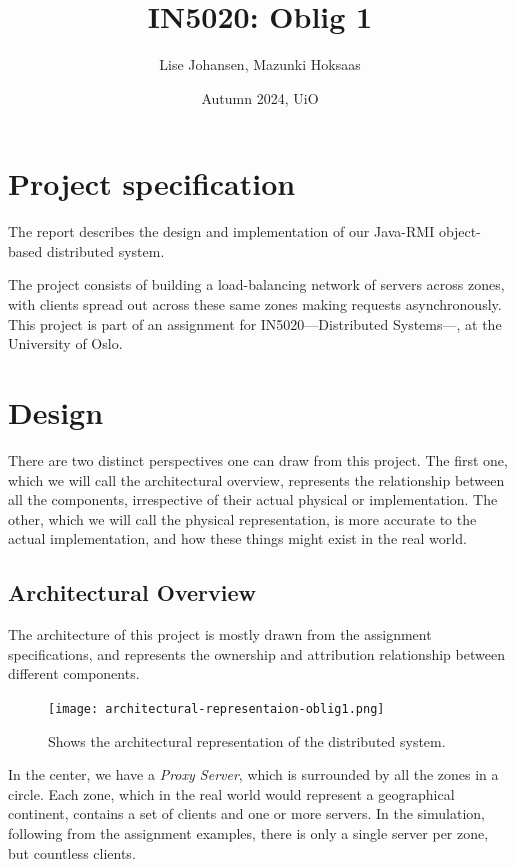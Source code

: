 \documentclass{article}
\title{IN5020: Oblig 1}
\author{Lise Johansen, Mazunki Hoksaas}
\date{Autumn 2024, UiO}
\begin{document}
\maketitle

\section{Project specification}
The report describes the design and implementation of our Java-RMI object-based distributed system. 

The project consists of building a load-balancing network of servers across zones, with clients spread out across these same zones making requests asynchronously. This project is part of an assignment for IN5020---Distributed Systems---, at the University of Oslo.

\section{Design}
There are two distinct perspectives one can draw from this project. The first one, which we will call the architectural overview, represents the relationship between all the components, irrespective of their actual physical or implementation. The other, which we will call the physical representation, is more accurate to the actual implementation, and how these things might exist in the real world.

\newpage

\subsection{Architectural Overview}
The architecture of this project is mostly drawn from the assignment specifications, and represents the ownership and attribution relationship between different components.

\begin{figure}[H]
    \centering
    \texttt{[image: architectural-representaion-oblig1.png]}
    \captionsetup{font=footnotesize}
    \caption{Shows the architectural representation of the distributed system.}
    \label{fig:enter-label}
\end{figure}

In the center, we have a \textit{Proxy Server}, which is surrounded by all the zones in a circle. Each zone, which in the real world would represent a geographical continent, contains a set of clients and one or more servers. In the simulation, following from the assignment examples, there is only a single server per zone, but countless clients.
\end{document}
